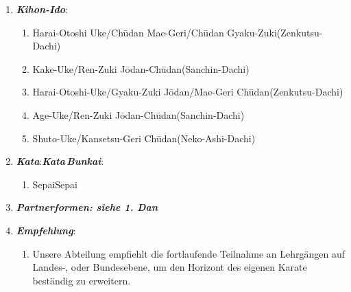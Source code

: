 	\begin{enumerate}[nosep]
		\item \textit{\textbf{Kihon-Ido}}:
		\begin{enumerate}[nosep]
			\item Harai-Otoshi	Uke/Ch\={u}dan Mae-Geri/Ch\={u}dan Gyaku-Zuki\tabto{335pt}(Zenkutsu-Dachi)
			\item Kake-Uke/Ren-Zuki J\={o}dan-Ch\={u}dan\tabto{335pt}(Sanchin-Dachi)
			\item Harai-Otoshi-Uke/Gyaku-Zuki J\={o}dan/Mae-Geri Ch\={u}dan\tabto{335pt}(Zenkutsu-Dachi)
			\item Age-Uke/Ren-Zuki J\={o}dan-Ch\={u}dan\tabto{335pt}(Sanchin-Dachi)
			\item Shuto-Uke/Kansetsu-Geri Ch\={u}dan\tabto{335pt}(Neko-Ashi-Dachi)
		\end{enumerate}
		\vspace{12pt}
		\item \textit{\textbf{Kata}}:\tabto{200pt}\textit{\textbf{Kata\,Bunkai}}:
		\begin{enumerate}[nosep]
			\item Sepai\tabto{200pt}Sepai
		\end{enumerate}
		\vspace{12pt}
		\item \textit{\textbf{Partnerformen: siehe 1. Dan}}
		\vspace{12pt}
		\item \textit{\textbf{Empfehlung}}:
		\begin{enumerate}[nosep]
			\item[] Unsere Abteilung empfiehlt die fortlaufende Teilnahme an Lehrgängen auf Landes-, oder Bundesebene, um den Horizont des eigenen Karate beständig zu erweitern.
		\end{enumerate}
	\end{enumerate}